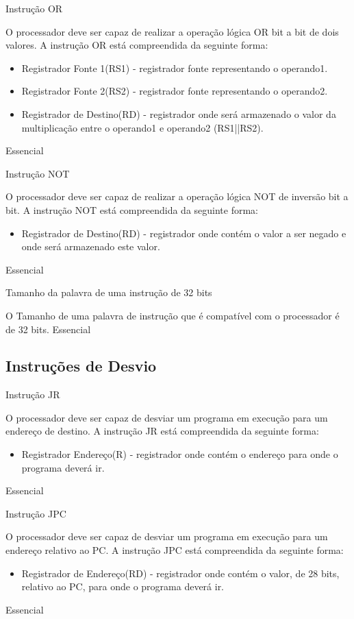 \documentclass{article}
\begin{document}
\begin{functional}
{{      \requirement
      {Instrução OR}
      {O processador deve ser capaz de realizar a operação lógica OR bit a bit de dois valores.
      A instrução OR está compreendida da seguinte forma:
       \begin{itemize}
        \item Registrador Fonte 1(RS1) - registrador fonte representando o operando1.
        \item Registrador Fonte 2(RS2) - registrador fonte representando o operando2.
        \item Registrador de Destino(RD) - registrador onde será armazenado o valor da multiplicação entre o operando1 e operando2 (RS1||RS2).
       \end{itemize}}
      {Essencial}

      \requirement
      {Instrução NOT}
      {O processador deve ser capaz de realizar a operação lógica NOT de inversão bit a bit.
      A instrução NOT está compreendida da seguinte forma:
       \begin{itemize}
         \item Registrador de Destino(RD) - registrador onde contém o valor a ser negado e onde será armazenado este valor.
         \end{itemize}}
      {Essencial}      
     

      \requirement
      {Tamanho da palavra de uma instrução de 32 bits}
      {O Tamanho de uma palavra de instrução que é compatível com o processador é de 32 bits.
      {Essencial}

    \subsection{Instruções de Desvio}

    \begin{functional}
      \requirement
      {Instrução JR}
      {O processador deve ser capaz de desviar um programa em execução para um endereço de destino.
      A instrução JR está compreendida da seguinte forma:
       \begin{itemize}
         \item Registrador Endereço(R) - registrador onde contém o endereço para onde o programa deverá ir.
         \end{itemize}}
      {Essencial}

      \requirement
      {Instrução JPC}
      {O processador deve ser capaz de desviar um programa em execução para um endereço relativo ao PC.
      A instrução JPC está compreendida da seguinte forma:
       \begin{itemize}
         \item Registrador de Endereço(RD) - registrador onde contém o valor, de 28 bits, relativo ao PC, para onde o programa deverá ir.
         \end{itemize}}
      {Essencial}


\end{functional}}}}
\end{functional}
\end{document}
